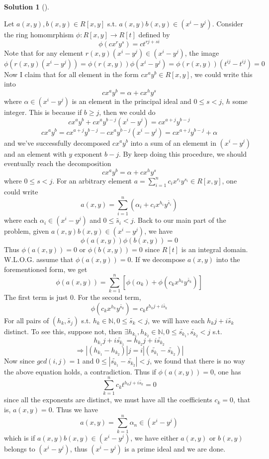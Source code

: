 \documentclass{article}
\theoremstyle{definition}
\newtheorem*{sol}{Solution}
\newenvironment{sols}[1][]{%
  \begin{sol}[#1]$ $\par\nobreak\ignorespaces
}{%
  \end{sol}
}
\begin{document}
\begin{sols}
  Let $a(x, y), b(x, y) \in R[x, y]$ s.t. $a(x, y) b(x, y) \in (x^i - y^j)$. Consider the ring homomrphism $\phi: R[x, y] \to R[t]$ defined by 
  \[
    \phi(c x^r y^s) = c t^{rj+si}
  \]
  Note that for any element $r(x, y) (x^i - y^j) \in (x^i - y^j)$, the image 
  \[
    \phi(r(x, y)(x^i - y^j)) = \phi(r(x, y)) \phi(x^i - y^j) = \phi(r(x, y)) (t^{ij} - t^{ij}) = 0
  \]
  Now I claim that for all element in the form $c x^a y^b \in R[x, y]$, we could write this into
  \[
    c x^a y^b = \alpha + cx^h y^s
  \]
  where $\alpha \in (x^i - y^j)$ is an element in the principal ideal and $0 \leq s < j$, $h$ some integer. This is because if $b \geq j$, then we could do
  \[
    c x^a y^b + c x^a y^{b - j} (x^i - y^j) = c x^{a + j} y^{b - j}
  \]
  \[
    c x^a y^b = c x^{a + j} y^{b - j} - c x^a y^{b - j} (x^i - y^j) = c x^{a + j} y^{b - j} + \alpha
  \]
  and we've successfully decomposed $c x^a y^b$ into a sum of an elememt in $(x^i - y^j)$ and an element with $y$ exponent $b - j$. By keep doing this procedure, we should eventually reach the decomposition
  \[
    c x^a y^b = \alpha + cx^h y^s
  \]
  where $0 \leq s < j$. For an arbitrary element $a = \sum_{i = 1}^n c_i x^{r_i} y^{s_i} \in R[x, y]$, one could write
  \[
    a(x, y) = \sum_{i = 1}^n (\alpha_i + c_i x^{h_i} y^{\tilde{s_i}})
  \]
  where each $\alpha_i \in (x^i - y^j)$ and $0 \leq \tilde{s_i} < j$. Back to our main part of the problem, given $a(x, y) b(x, y) \in (x^i - y^j)$, we have
  \[
    \phi(a(x, y)) \phi(b(x, y)) = 0
  \]
  Thus $\phi(a(x, y)) = 0$ or $\phi(b(x, y)) = 0$ since $R[t]$ is an integral domain. W.L.O.G. assume that $\phi(a(x, y))  = 0$. If we decompose $a(x, y)$ into the forementioned form, we get
  \[
    \phi(a(x, y)) = \sum_{k = 1}^n [\phi(\alpha_k) + \phi(c_k x^{h_k} y^{\tilde{s_k}})]
  \]
  The first term is just 0. For the second term, 
  \[
    \phi(c_k x^{h_k} y^{\tilde{s_k}}) = c_k t^{h_k j + i \tilde{s_k}}
  \]
  For all pairs of $(h_k, \tilde{s_j})$ s.t. $h_k \in \mathbb{N}, 0 \leq \tilde{s_k} < j$, we will have each $h_k j + i \tilde{s_k}$ distinct. To see this, suppose not, then $\exists h_{k_1}, h_{k_2} \in \mathbb{N}, 0 \leq \tilde{s_{k_1}}, \tilde{s_{k_2}} < j$ s.t. 
  \[
    h_{k_1} j + i \tilde{s_{k_1}} = h_{k_2} j + i \tilde{s_{k_2}}
  \]
  \[
    \Rightarrow |(h_{k_1} -h_{k_2})| j = i |(\tilde{s_{k_1}} - \tilde{s_{k_2}})|
  \]
  Now since $gcd(i, j) = 1$ and $0 \leq |\tilde{s_{k_1}} - \tilde{s_{k_2}}| < j$, we found that there is no way the above equation holds, a contradiction. Thus if $\phi(a(x, y)) = 0$, one has
  \[
    \sum_{k = 1}^n c_k t^{h_k j + i \tilde{s_k}} = 0
  \]
  since all the exponents are distinct, we must have all the coefficients $c_k = 0$, that is, $a(x, y) = 0$. Thus we have
  \[
    a(x, y) = \sum_{k = 1}^n \alpha_n \in (x^i - y^j)
  \]
  which is if $a(x, y) b(x, y) \in (x^i - y^j)$, we have either $a(x, y)$ or $b(x, y)$ belongs to $(x^i - y^j)$, thus $(x^i - y^j)$ is a prime ideal and we are done. 

\end{sols}
\end{document}
